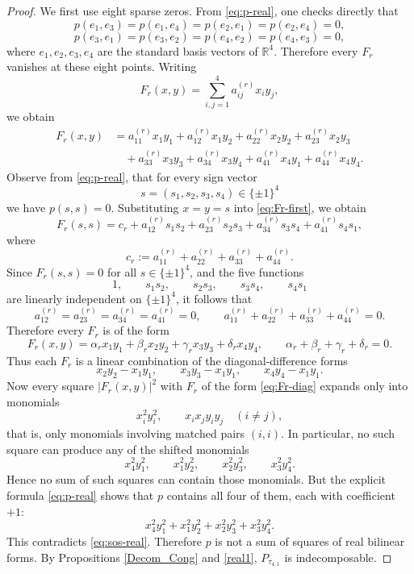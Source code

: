 \documentclass[12pt,a4paper]{amsart}
\theoremstyle{plain}
\theoremstyle{remark}
\theoremstyle{definition}
\begin{document}
\begin{proof}
We first use eight sparse zeros. From \eqref{eq:p-real}, one checks directly that
\[
p(e_1,e_3)=p(e_1,e_4)=p(e_2,e_1)=p(e_2,e_4)=0,
\]
\[
p(e_3,e_1)=p(e_3,e_2)=p(e_4,e_2)=p(e_4,e_3)=0,
\]
where \(e_1,e_2,e_3,e_4\) are the standard basis vectors of \(\mathbb R^4\). Therefore every \(F_r\) vanishes at these eight points. Writing
\[
F_r(x,y)=\sum_{i,j=1}^4 a^{(r)}_{ij}x_i y_j,
\]
we obtain
\begin{equation}
\label{eq:Fr-first}
\begin{aligned}
F_r(x,y)
&=a^{(r)}_{11}x_1y_1+a^{(r)}_{12}x_1y_2+a^{(r)}_{22}x_2y_2+a^{(r)}_{23}x_2y_3\\
&\quad +a^{(r)}_{33}x_3y_3+a^{(r)}_{34}x_3y_4+a^{(r)}_{41}x_4y_1+a^{(r)}_{44}x_4y_4.
\end{aligned}
\end{equation}
Observe from \eqref{eq:p-real}, that for every sign vector
\[
s=(s_1,s_2,s_3,s_4)\in\{\pm1\}^4
\]
we have $ p(s,s)=0.$
Substituting \(x=y=s\) into \eqref{eq:Fr-first}, we obtain
\[
F_r(s,s)
=
c_r
+a^{(r)}_{12}s_1s_2
+a^{(r)}_{23}s_2s_3
+a^{(r)}_{34}s_3s_4
+a^{(r)}_{41}s_4s_1,
\]
where
\[
c_r:=a^{(r)}_{11}+a^{(r)}_{22}+a^{(r)}_{33}+a^{(r)}_{44}.
\]
Since \(F_r(s,s)=0\) for all \(s\in\{\pm1\}^4\), and the five functions
\[
1,\qquad s_1s_2,\qquad s_2s_3,\qquad s_3s_4,\qquad s_4s_1
\]
are linearly independent on \(\{\pm1\}^4\), it follows that
\[
a^{(r)}_{12}=a^{(r)}_{23}=a^{(r)}_{34}=a^{(r)}_{41}=0,
\qquad
a^{(r)}_{11}+a^{(r)}_{22}+a^{(r)}_{33}+a^{(r)}_{44}=0.
\]
Therefore every \(F_r\) is of the form
\begin{equation}
\label{eq:Fr-diag}
F_r(x,y)=\alpha_r x_1y_1+\beta_r x_2y_2+\gamma_r x_3y_3+\delta_r x_4y_4,
\qquad
\alpha_r+\beta_r+\gamma_r+\delta_r=0.
\end{equation}
Thus each \(F_r\) is a linear combination of the diagonal-difference forms
\[
x_2y_2-x_1y_1,\qquad x_3y_3-x_1y_1,\qquad x_4y_4-x_1y_1.
\]
Now every square \(|F_r(x,y)|^2\) with \(F_r\) of the form \eqref{eq:Fr-diag} expands only into monomials
\[
x_i^2y_i^2,\qquad x_i x_j y_i y_j \quad (i\neq j),
\]
that is, only monomials involving matched pairs \((i,i)\). In particular, no such square can produce any of the shifted monomials
\[
x_4^2y_1^2,\qquad x_1^2y_2^2,\qquad x_2^2y_3^2,\qquad x_3^2y_4^2.
\]
Hence no sum of such squares can contain those monomials.
But the explicit formula \eqref{eq:p-real} shows that \(p\) contains all four of them, each with coefficient \(+1\):
\[
x_4^2y_1^2+x_1^2y_2^2+x_2^2y_3^2+x_3^2y_4^2.
\]
This contradicts \eqref{eq:sos-real}.
Therefore \(p\) is not a sum of squares of real bilinear forms. By Propositions \ref{Decom_Cong} and \ref{real1}, \(P_{\tau_{4,1}}\) is indecomposable.
\end{proof}
\end{document}
